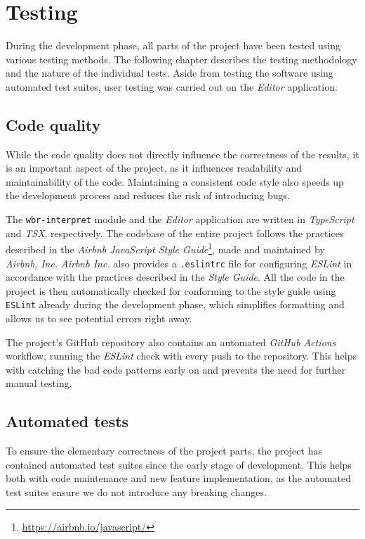 \chapter{Testing}

During the development phase, all parts of the project have been tested using various testing methods.
The following chapter describes the testing methodology and the nature of the individual tests.
Aside from testing the software using automated test suites, user testing was carried out on the \textit{Editor} application.

\section{Code quality}

While the code quality does not directly influence the correctness of the results, it is an important aspect of the project, as it influences readability and maintainability of the code.
Maintaining a consistent code style also speeds up the development process and reduces the risk of introducing bugs.

The \texttt{wbr-interpret} module and the \textit{Editor} application are written in \textit{TypeScript} and \textit{TSX}, respectively.
The codebase of the entire project follows the practices described in the \textit{Airbnb JavaScript Style Guide}\footnote{\href{https://airbnb.io/javascript/}{https://airbnb.io/javascript/}}, made and maintained by \textit{Airbnb, Inc.}
\textit{Airbnb Inc.} also provides a \texttt{.eslintrc} file for configuring \textit{ESLint} in accordance with the practices described in the \textit{Style Guide}.
All the code in the project is then automatically checked for conforming to the style guide using \texttt{ESLint} already during the development phase, which simplifies formatting and allows us to see potential errors right away.

The project's GitHub repository also contains an automated \textit{GitHub Actions} workflow, running the \textit{ESLint} check with every push to the repository.
This helps with catching the bad code patterns early on and prevents the need for further manual testing.

\section{Automated tests}

To ensure the elementary correctness of the project parts, the project has contained automated test suites since the early stage of development.
This helps both with code maintenance and new feature implementation, as the automated test suites ensure we do not introduce any breaking changes.

